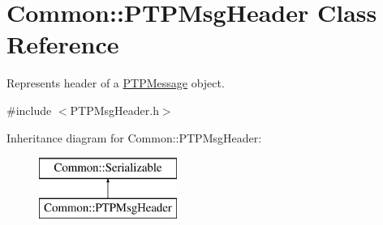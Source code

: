 \hypertarget{class_common_1_1_p_t_p_msg_header}{\section{Common\-:\-:P\-T\-P\-Msg\-Header Class Reference}
\label{class_common_1_1_p_t_p_msg_header}
}


Represents header of a \hyperlink{class_common_1_1_p_t_p_message}{P\-T\-P\-Message} object.  




{\ttfamily \#include $<$P\-T\-P\-Msg\-Header.\-h$>$}

Inheritance diagram for Common\-:\-:P\-T\-P\-Msg\-Header\-:\begin{figure}[H]
\begin{center}
\leavevmode
\includegraphics[height=2.000000cm]{class_common_1_1_p_t_p_msg_header}
\end{center}
\end{figure}
